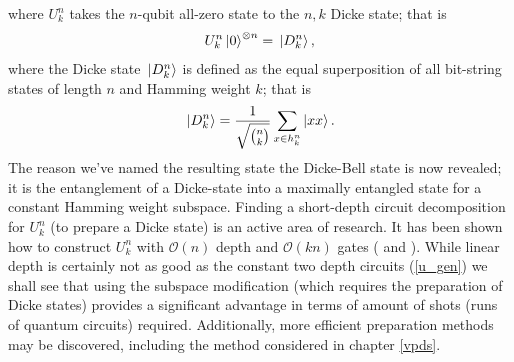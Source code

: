 \documentclass[Dual]{msu-thesis}
\begin{document}
where $U^n_k$ takes the $n$-qubit all-zero state to the $n,k$ Dicke state; that is
\begin{align}
U^n_k\ket{0}^{\otimes n}=\ket*{D^n_k}
,\end{align}
where the Dicke state $\ket*{D^n_k}$ is defined as the equal superposition of all bit-string states of length $n$ and Hamming weight $k$; that is
\begin{align}
\ket*{D^n_k}
=
\frac{1}{\sqrt{{n \choose k}}}
\sum_{x\in h^n_k}\ket{xx}    
.\end{align}
The reason we've named the resulting state the Dicke-Bell state is now revealed; it is the entanglement of a Dicke-state into a maximally entangled state for a constant Hamming weight subspace. Finding a short-depth circuit decomposition for $U^n_k$ (to prepare a Dicke state) is an active area of research. It has been shown how to construct $U^n_k$ with $\mathcal{O}(n)$ depth and $\mathcal{O}(kn)$ gates (\cite{ref:dicke_prep} and \cite{ref:dicke_prep_dac}). While linear depth is certainly not as good as the constant two depth circuits (\ref{u_gen}) we shall see that using the subspace modification (which requires the preparation of Dicke states) provides a significant advantage in terms of amount of shots (runs of quantum circuits) required. Additionally, more efficient preparation methods may be discovered, including the method considered in chapter \ref{vpds}. 
\end{document}

